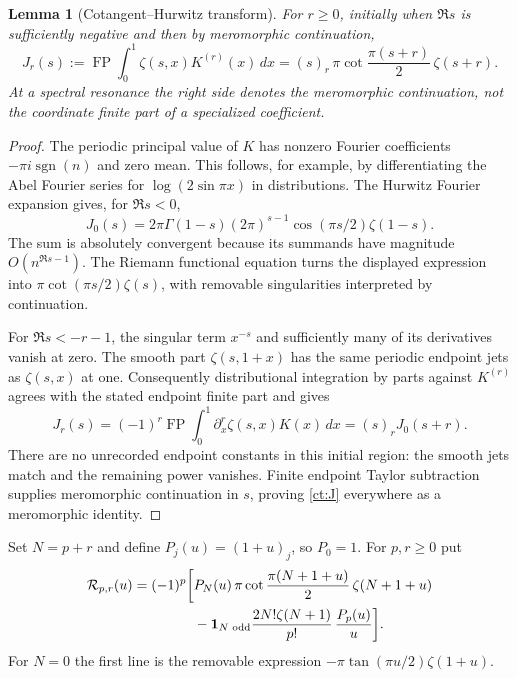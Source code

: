 \documentclass[11pt,a4paper]{article}
\numberwithin{equation}{section}
\newtheorem{lemma}[theorem]{Lemma}
\theoremstyle{definition}
\theoremstyle{remark}
\begin{document}
\begin{lemma}[Cotangent--Hurwitz transform]
\label{ct:transform}
For $r\ge0$, initially when $\Re s$ is sufficiently negative and then by
meromorphic continuation,
\begin{equation}\label{ct:J}
 J_r(s):=\operatorname{FP}\int_0^1\zeta(s,x)K^{(r)}(x)\,dx
 =(s)_r\,\pi\cot\frac{\pi(s+r)}2\,\zeta(s+r).
\end{equation}
At a spectral resonance the right side denotes the meromorphic
continuation, not the coordinate finite part of a specialized
coefficient.
\end{lemma}
\begin{proof}
The periodic principal value of $K$ has nonzero Fourier coefficients
$-\pi i\operatorname{sgn}(n)$ and zero mean. This follows, for example,
by differentiating the Abel Fourier series for
$\log(2\sin\pi x)$ in distributions. The Hurwitz Fourier expansion \cite[Eq.~25.11.9]{DLMFHurwitz} gives,
for $\Re s<0$,
\[
 J_0(s)=2\pi\Gamma(1-s)(2\pi)^{s-1}
             \cos(\pi s/2)\zeta(1-s).
\]
The sum is absolutely convergent because its summands have magnitude
$O(n^{\Re s-1})$. The Riemann functional equation \cite{DLMFZetaReflection} turns the displayed
expression into $\pi\cot(\pi s/2)\zeta(s)$, with removable singularities
interpreted by continuation.

For $\Re s<-r-1$, the singular term $x^{-s}$ and sufficiently many
of its derivatives vanish at zero. The smooth part
$\zeta(s,1+x)$ has the same periodic endpoint jets as $\zeta(s,x)$ at
one. Consequently distributional integration by parts against
$K^{(r)}$ agrees with the stated endpoint finite part and gives
\[
 J_r(s)=(-1)^r\operatorname{FP}\int_0^1
              \partial_x^r\zeta(s,x)K(x)\,dx
       =(s)_rJ_0(s+r).
\]
There are no unrecorded endpoint constants in this initial region:
the smooth jets match and the remaining power vanishes. Finite endpoint
Taylor subtraction supplies meromorphic continuation in $s$, proving
\eqref{ct:J} everywhere as a meromorphic identity.
\end{proof}

Set $N=p+r$ and define $P_j(u)=(1+u)_j$, so $P_0=1$.
For $p,r\ge0$ put
\begin{align}
 \mathcal R_{p,r}(u)
 =(-1)^p\bigg[&P_N(u)\,
      \pi\cot\frac{\pi(N+1+u)}2\,\zeta(N+1+u)\notag\\
 &-\mathbf1_{N\text{ odd}}
      \frac{2N!\zeta(N+1)}{p!}\,\frac{P_p(u)}u\bigg].
 \label{ct:R}
\end{align}
For $N=0$ the first line is the removable expression
$-\pi\tan(\pi u/2)\zeta(1+u)$.
\end{document}
